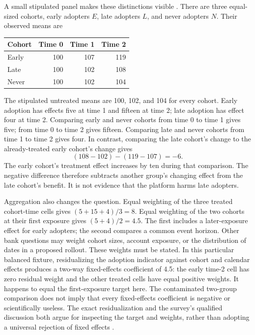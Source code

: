A small stipulated panel makes these distinctions visible
\citep{exec14_workflow_oracle}. There are three equal-sized cohorts, early
adopters $E$, late adopters $L$, and never adopters $N$. Their observed means are
\begin{center}
\begin{tabular}{lrrr}
\toprule
Cohort & Time 0 & Time 1 & Time 2\\
\midrule
Early &100&107&119\\
Late &100&102&108\\
Never &100&102&104\\
\bottomrule
\end{tabular}
\end{center}
The stipulated untreated means are 100, 102, and 104 for every cohort.
Early adoption has effects five at time 1 and fifteen at time 2; late adoption
has effect four at time 2. Comparing early and never cohorts from time 0 to
time 1 gives five; from time 0 to time 2 gives fifteen. Comparing late and
never cohorts from time 1 to time 2 gives four. In contrast, comparing the
late cohort's change to the already-treated early cohort's change gives
\[
 (108-102)-(119-107)=-6.
\]
The early cohort's treatment effect increases by ten during that comparison.
The negative difference therefore subtracts another group's changing effect
from the late cohort's benefit. It is not evidence that the platform harms
late adopters.

Aggregation also changes the question. Equal weighting of the three treated
cohort-time cells gives $(5+15+4)/3=8$. Equal weighting of the two cohorts at
their first exposure gives $(5+4)/2=4.5$. The first includes a later-exposure
effect for early adopters; the second compares a common event horizon. Other
bank questions may weight cohort sizes, account exposure, or the distribution
of dates in a proposed rollout. These weights must be stated. In this particular
balanced fixture, residualizing the adoption indicator against cohort and
calendar effects produces a two-way fixed-effects coefficient of 4.5: the
early time-2 cell has zero residual weight and the other treated cells have
equal positive weights. It happens to equal the first-exposure target here.
The contaminated two-group comparison does not imply that every fixed-effects
coefficient is negative or scientifically useless. The exact residualization
and the survey's qualified discussion both argue for inspecting the target and
weights, rather than adopting a universal rejection of fixed effects
\citep{panelreview2024,exec14_workflow_oracle}.

